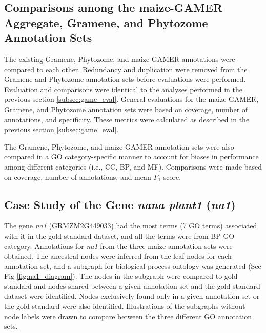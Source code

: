 \subsection{Comparisons among the maize-GAMER Aggregate, Gramene, and Phytozome Annotation Sets}
The existing Gramene, Phytozome, and maize-GAMER annotations were compared to each other. Redundancy and duplication were removed from the Gramene and Phytozome annotation sets before evaluations were performed. Evaluation and comparisons were identical to the analyses performed in the previous section \ref{subsec:game_eval}.
General evaluations for the maize-GAMER, Gramene, and Phytozome annotation sets were based on coverage, number of annotations, and specificity. These metrics were calculated as described in the previous section \ref{subsec:game_eval}.

The Gramene, Phytozome, and maize-GAMER annotation sets were also compared in a GO category-specific manner to account for biases in performance among different categories (i.e., CC, BP, and MF). Comparisons were made based on coverage, number of annotations, and mean $F_1$ score.

\subsection{Case Study of the Gene \emph{nana plant1} (\emph{na1})}
The gene \emph{na1} (GRMZM2G449033) had the most terms (7 GO terms) associated with it in the gold standard dataset, and all the terms were from BP GO category. Annotations for \emph{na1} from the three maize annotation sets were obtained. The ancestral nodes were inferred from the leaf nodes for each annotation set, and a subgraph for biological process ontology was generated (See Fig \ref{fig:na1_diagram}). The nodes in the subgraph were compared to gold standard and nodes shared between a given annotation set and the gold standard dataset were identified. Nodes exclusively found only in a given annotation set or the gold standard were also identified. Illustrations of the subgraphs without node labels were drawn to compare between the three different GO annotation sets.